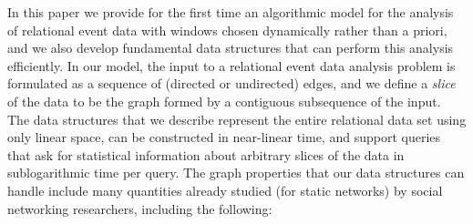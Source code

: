 \documentclass[11pt]{article}
\begin{document}
In this paper we provide for the first time an algorithmic model for the analysis of relational event data with windows chosen dynamically rather than a priori, and we also develop fundamental data structures that can perform this analysis efficiently. In our model, the input to a relational event data analysis problem is formulated as a sequence of (directed or undirected) edges, and we define a \emph{slice} of the data to be the graph formed by a contiguous subsequence of the input. The data structures that we describe  represent the entire relational data set using only linear space, can be constructed in near-linear time, and support queries that ask for statistical information about arbitrary slices of the data in sublogarithmic time per query. The graph properties that our data structures can handle include many quantities already studied (for static networks) by social networking researchers, including the following:
\end{document}
